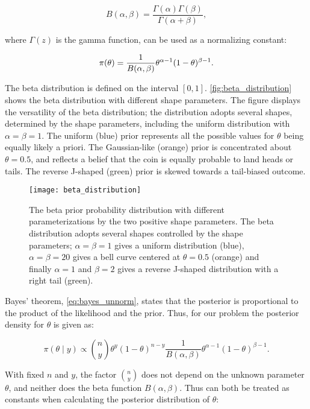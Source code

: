 \begin{equation*}
    B (\alpha, \beta) = \frac{\Gamma(\alpha)\Gamma(\beta)}{\Gamma(\alpha + \beta)},
\end{equation*}

where $\Gamma (z)$ is the gamma function, can be used as a normalizing constant:

\begin{equation}\label{eq:beta_prior}
    \pi \qty(\theta) = \frac{1}{B(\alpha, \beta)} \theta^{\alpha -1} (1-\theta)^{\beta -1}.
\end{equation}

The beta distribution is defined on the interval $[0, 1]$. \autoref{fig:beta_distribution} shows the beta distribution with different shape parameters. The figure displays the versatility of the beta distribution; the distribution adopts several shapes, determined by the shape parameters, including the uniform distribution with $\alpha = \beta = 1$. The uniform (blue) prior represents all the possible values for $\theta$ being equally likely a priori. The Gaussian-like (orange) prior is concentrated about $\theta=0.5$, and reflects a belief that the coin is equally probable to land heads or tails. The reverse J-shaped (green) prior is skewed towards a tail-biased outcome.

\begin{figure}[ht]
    \centering
    \texttt{[image: beta\_distribution]}
    \caption{The beta prior probability distribution with different parameterizations by the two positive shape parameters. The beta distribution adopts several shapes controlled by the shape parameters; $\alpha=\beta=1$ gives a uniform distribution (blue), $\alpha=\beta=20$ gives a bell curve centered at $\theta=0.5$ (orange) and finally $\alpha=1$ and $\beta=2$ gives a reverse J-shaped distribution with a right tail (green).
    }
    \label{fig:beta_distribution}
\end{figure} 


Bayes' theorem, \autoref{eq:bayes_unnorm}, states that the posterior is proportional to the product of the likelihood and the prior. Thus, for our problem the posterior density for $\theta$ is given as: 

\begin{equation*}
    \pi (\theta \mid y) \propto \binom{n}{y} \theta^y (1-\theta)^{n-y} \frac{1}{B(\alpha, \beta)} \theta^{\alpha-1}(1-\theta)^{\beta -1}.
\end{equation*}

With fixed $n$ and $y$, the factor $\binom{n}{y}$ does not depend on the unknown parameter $\theta$, and neither does the beta function $B(\alpha, \beta)$. Thus can both be treated as constants when calculating the posterior distribution of $\theta$:

